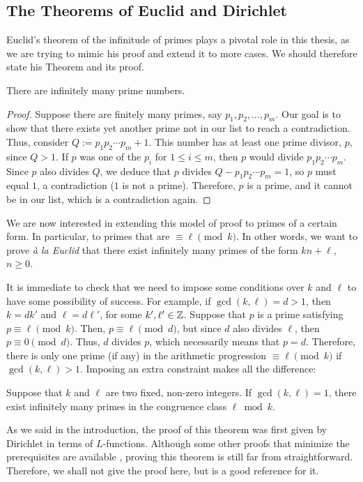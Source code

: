 \documentclass[../main.tex]{subfiles}
\begin{document}
\subsection{The Theorems of Euclid and Dirichlet}\label{sec:EuclidDirichletThms}
Euclid's theorem of the infinitude of primes \cite{Euclid} plays a pivotal role in this thesis, as we are trying to mimic his proof and extend it to more cases. We should therefore state his Theorem and its proof.

\begin{theorem}\label{th:Euclid}
	There are infinitely many prime numbers.
\end{theorem}
\begin{proof}
	Suppose there are finitely many primes, say $p_1,p_2,\dots,p_m$. Our goal is to show that there exists yet another prime not in our list to reach a contradiction. Thus, consider $Q:=p_1p_2\cdots p_m+1$. This number has at least one prime divisor, $p$, since $Q>1$. If $p$ was one of the $p_i$ for $1\leqslant i \leqslant m$, then $p$ would divide $p_1p_2\cdots p_m$. Since $p$ also divides $Q$, we deduce that $p$ divides $Q-p_1p_2\cdots p_m=1$, so $p$ must equal $1$, a contradiction ($1$ is not a prime). Therefore, $p$ is a prime, and it cannot be in our list, which is a contradiction again.
\end{proof}

We are now interested in extending this model of proof to primes of a  certain form. In particular, to primes that are $\equiv\ell \pmod{k}$. In other words, we want to prove \textit{à la Euclid} that there exist infinitely many primes of the form $kn+\ell$, $n\geqslant 0$.

It is immediate to check that we need to impose some conditions over $k$ and $\ell$ to have some possibility of success. For example, if $\gcd(k, \ell)=d>1$, then $k=dk'$ and $\ell=d\ell'$, for some $k', \ell'\in\mathbb{Z}$. Suppose that $p$ is a prime satisfying $p\equiv \ell\pmod{k}$. Then, $p\equiv\ell\pmod{d}$, but since $d$ also divides $\ell$, then $p\equiv 0 \pmod{d}$. Thus, $d$ divides $p$, which necessarily means that $p=d$. Therefore, there is only one prime (if any) in the arithmetic progression $\equiv\ell\pmod{k}$ if $\gcd(k, \ell)>1$. Imposing an extra constraint makes all the difference:
\begin{theorem}\label{th:Dirichlet}
	Suppose that $k$ and $\ell$ are two fixed, non-zero integers. If $\gcd(k, \ell)=1$, there exist infinitely many primes in the congruence class $\ell \bmod{k}$.
\end{theorem}
	As we said in the introduction, the proof of this theorem was first given by Dirichlet in terms of $L$-functions. Although some other proofs that minimize the prerequisites are available \cite{Selberg, ShapiroI, ShapiroII}, proving this theorem is still far from straightforward. Therefore, we shall not give the proof here, but \cite{Dirichlet} is a good reference for it.
	
\end{document}
